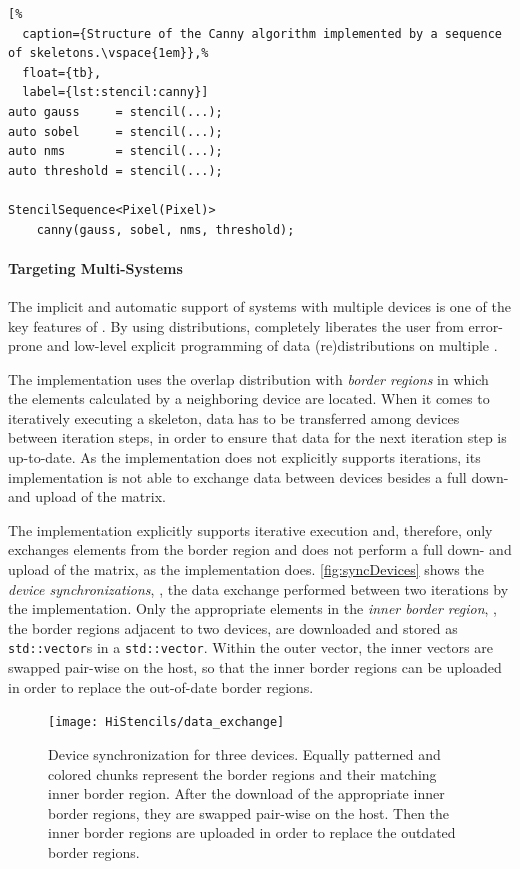 \begin{lstlisting}[%
  caption={Structure of the Canny algorithm implemented by a sequence of skeletons.\vspace{1em}},%
  float={tb},
  label={lst:stencil:canny}]
auto gauss     = stencil(...);
auto sobel     = stencil(...);
auto nms       = stencil(...);
auto threshold = stencil(...);

StencilSequence<Pixel(Pixel)>
    canny(gauss, sobel, nms, threshold);
\end{lstlisting}

\paragraph{Targeting Multi-\GPU Systems}
The implicit and automatic support of systems with multiple \OpenCL devices is one of the key features of \SkelCL.
By using distributions, \SkelCL completely liberates the user from error-prone and low-level explicit programming of data (re)distributions on multiple \GPUs. 

The  implementation uses the overlap distribution with \textit{border regions} in which the elements calculated by a neighboring device are located.
When it comes to iteratively executing a skeleton, data has to be transferred among devices between iteration steps, in order to ensure that data for the next iteration step is up-to-date.
As the  implementation does not explicitly supports iterations, its implementation is not able to exchange data between devices besides a full down- and upload of the matrix.

The  implementation explicitly supports iterative execution and, therefore, only exchanges elements from the border region and does not perform a full down- and upload of the matrix, as the  implementation does.
\autoref{fig:syncDevices} shows the \textit{device synchronizations}, \ie, the data exchange performed between two iterations by the  implementation.
Only the appropriate elements in the \emph{inner border region}, \ie, the border regions adjacent to two \OpenCL devices, are downloaded and stored as \texttt{std::vector}s in a \texttt{std::vector}.
Within the outer vector, the inner vectors are swapped pair-wise on the host, so that the inner border regions can be uploaded in order to replace the out-of-date border regions.

\begin{figure}[tb]
  \centering
  \texttt{[image: HiStencils/data\_exchange]}
  \caption[Device synchronization for three devices during the execution of the \stencil skeleton.]
          {\small Device synchronization for three devices. Equally patterned and colored chunks represent the border regions and their matching inner border region. After the download of the appropriate inner border regions, they are swapped pair-wise on the host. Then the inner border regions are uploaded in order to replace the outdated border regions.}
  \label{fig:syncDevices}
  \vspace{1em}
\end{figure}


